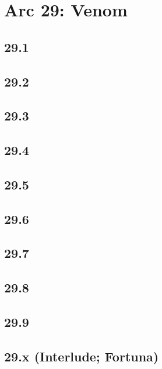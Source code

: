 \part{Arc 29: Venom}
 \chapter{29.1}
 \chapter{29.2}
 \chapter{29.3}
 \chapter{29.4}
 \chapter{29.5}
 \chapter{29.6}
 \chapter{29.7}
 \chapter{29.8}
 \chapter{29.9}
 \chapter{29.x (Interlude; Fortuna)}











